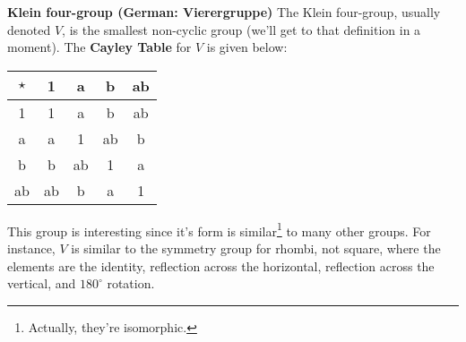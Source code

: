 \begin{ex}
\label{ex:vierergruppe}
  \textbf{Klein four-group (German: Vierergruppe)}
  The Klein four-group, usually denoted $V$, is the smallest non-cyclic group (we'll get to that definition in a moment).
  The \textbf{Cayley Table} for $V$ is given below:

  \begin{center}
  \begin{tabular}{c|cccc}
    $\star$ & 1 & a & b & ab \\
    \toprule
    1       & 1  & a  & b  & ab \\
    a       & a  & 1  & ab & b \\
    b       & b  & ab & 1  & a \\
    ab      & ab & b  & a  & 1 
  \end{tabular}
  \end{center}

  This group is interesting since it's form is similar\footnote{Actually, they're isomorphic.} to many other groups.
  For instance, $V$ is similar to the symmetry group for rhombi, not square, where the elements are the identity, reflection across the horizontal, reflection across the vertical, and $180^\circ$ rotation.
\end{ex}

\begin{comment}
This is the Cayley Digraph for the Klein four-group.
\begin{tikzpicture}[>=latex',scale=1]
    \begin{dot2tex}[dot,tikz,codeonly,styleonly,options=-s -tmath]
        digraph G{
            node [shape="circle"];
            1 -> 1 [label="1"];
            1 -> a [label="a"];
            1 -> b [label="b"];
            1 -> ab [label="ab"];

            a -> a [label="1"];
            a -> 1 [label="a"];
            a -> ab [label="b"];
            a -> b [label="ab"];

            b -> 1 [label="b"];
            b -> b [label="1"];
            b -> a [label="ab"];
            b -> ab [label="a"];

            ab -> a [label="b"];
            ab -> b [label="a"];
            ab -> ab [label="1"];
            ab -> 1 [label="ab"];
            {rank=same; 1;b}
            {rank=same; a;ab}
        }
    \end{dot2tex}.
\end{tikzpicture}
\end{comment}


